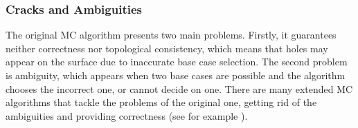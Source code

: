 \subsubsection{Cracks and Ambiguities}
The original \acf{MC} algorithm presents two main problems. Firstly, it guarantees neither correctness nor topological consistency, which means that holes may appear on the surface due to inaccurate base case selection. The second problem is ambiguity, which appears when two base cases are possible and the algorithm chooses the incorrect one, or cannot decide on one. There are many extended \ac{MC} algorithms that tackle the problems of the original one, getting rid of the ambiguities and providing correctness (see for example \cite{ExtendedMC}).
